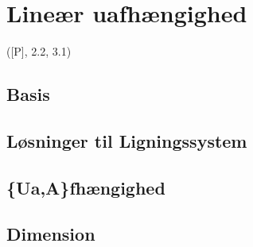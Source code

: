 \newpage
\chapter{Lineær uafhængighed}
([P], 2.2, 3.1)

\section{Basis}


\section{Løsninger til Ligningssystem}


\section{\{Ua,A\}fhængighed}






\section{Dimension}


